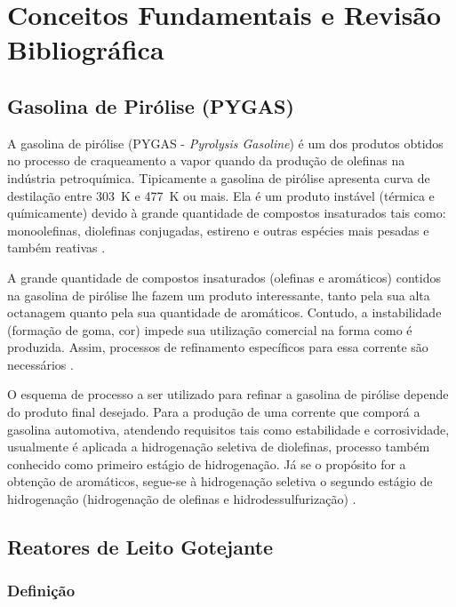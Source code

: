 %
\chapter{Conceitos Fundamentais e Revisão Bibliográfica}
\label{chap:revisaobibliografica}

\section{Gasolina de Pirólise (PYGAS)} \label{sec:pygas}
A gasolina de pirólise (PYGAS - \emph{Pyrolysis Gasoline}) é um dos produtos
obtidos no processo de craqueamento a vapor quando da produção de olefinas na
indústria petroquímica. Tipicamente a gasolina de pirólise apresenta curva de
destilação entre \SI{303}{K} e \SI{477}{K} ou mais. Ela é um produto instável
(térmica e químicamente) devido à grande quantidade de compostos insaturados tais como:
monoolefinas, diolefinas conjugadas, estireno e outras espécies mais pesadas e
também reativas \cite{Cheng1986}.
 
A grande quantidade de compostos insaturados (olefinas e aromáticos) contidos
na gasolina de pirólise lhe fazem um produto interessante, tanto pela
sua alta octanagem quanto pela sua quantidade de aromáticos. Contudo, a
instabilidade (formação de goma, cor) impede sua utilização comercial na forma
como é produzida. Assim, processos de refinamento específicos para essa corrente
são necessários \cite{Derrien1986}.

O esquema de processo a ser utilizado para refinar a gasolina de pirólise
depende do produto final desejado. Para a produção de uma corrente que
comporá a gasolina automotiva, atendendo requisitos tais como estabilidade e
corrosividade, usualmente é aplicada a hidrogenação seletiva de diolefinas,
processo também conhecido como primeiro estágio de hidrogenação. Já se o
propósito for a obtenção de aromáticos, segue-se à hidrogenação seletiva o
segundo estágio de hidrogenação (hidrogenação de olefinas e hidrodessulfurização)
\cite{Derrien1986}.

\section{Reatores de Leito Gotejante} \label{sec:reatorestbr}

\subsection{Definição} \label{sec:definicao}

